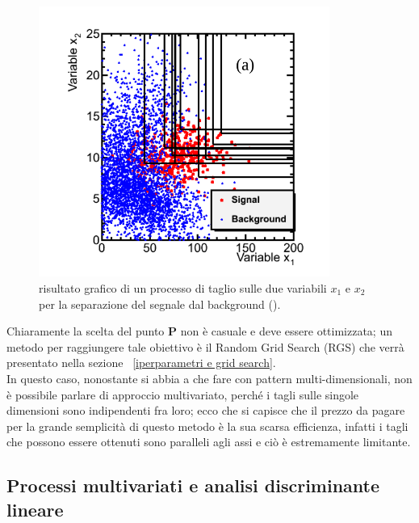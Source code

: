 \begin{figure}[h!]
	\centering
	\includegraphics[width=0.85\textwidth]{figs/Grid_example.png}
	\caption{risultato grafico di un processo di taglio sulle due variabili $x_1$ e $x_2$ per la separazione del segnale dal background (\cite{Metodi_multivariati}).}
	\label{fig:grid_example}
\end{figure}

Chiaramente la scelta del punto $\textbf{P}$ non è casuale e deve essere ottimizzata; un metodo per raggiungere tale obiettivo è il Random Grid Search (RGS) che verrà presentato nella sezione ~\ref{iperparametri e grid search}. \\
In questo caso, nonostante si abbia a che fare con pattern multi-dimensionali, non è possibile parlare di approccio multivariato, perché i tagli sulle singole dimensioni sono indipendenti fra loro; ecco che si capisce che il prezzo da pagare per la grande semplicità di questo metodo è la sua scarsa efficienza, infatti i tagli che possono essere ottenuti sono paralleli agli assi e ciò è estremamente limitante.

\newpage

\subsection{Processi multivariati e analisi discriminante lineare}
\label{metodi lineari e discriminante di Fisher}

